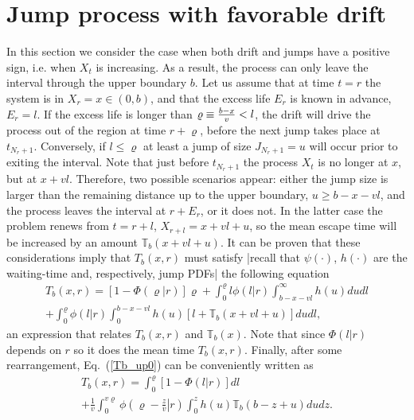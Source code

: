 \documentclass[english,aps,a4paper,twocolumn,showpacs,showkeys,amsfonts,amsmath,amssymb,amscd,nofootinbib]{revtex4}
\newcommand{\1}{\'\i}
\newcommand{\TT}{\mathbb{T}}\newcommand{\FF}{\mathbb{F}}
\begin{document}
\section{\label{S_up}Jump process with favorable drift}%
In this section we consider the case when both drift and jumps
have a positive sign, i.e. when $X_t$ is increasing. As a result, the process can only leave the interval through the upper
boundary $b$. Let us assume that at time $t=r$ the system is in $X_r=x\in(0,b)$, and that the excess life $E_r$ is known in advance, $E_r=l$. If the excess life is longer than $\varrho \equiv {b-x\over v}< l$, the drift will drive the process
out of the region at time $r+\varrho$, before the next jump takes place at $t_{N_r+1}$. Conversely, if $l \leqslant \varrho$ at least a jump of size $J_{N_r+1}=u$ will occur prior to exiting the interval. Note that just before $t_{N_r+1}$ the process $X_t$ is no longer at $x$, but at $x+v l$. Therefore, two possible scenarios appear: either
the jump size is larger than the remaining distance up to the upper boundary, $u\geqslant b-x-v l$, and the process leaves the
interval at $r+E_r$, 
or it does not. In the latter case the problem renews from $t=r+l$, $X_{r+l}=x+v
l+u$, so the mean escape time will be increased by an amount $\TT_b\left(x+v
l+u\right)$. It can be proven that  these considerations imply
that $T_b(x,r)$ must satisfy |recall that $\psi(\cdot)$, $h(\cdot)$ are the
waiting-time and, respectively, jump PDFs| the following equation
\begin{eqnarray}
T_b(x,r)=\left[1-\Phi\left(\varrho|r\right)\right] \varrho +
\int^{\varrho}_{0} l
\phi(l|r) \int^{\infty}_{b-x-v l} h(u) d  ud  l\nonumber \\
+\int^{\varrho}_{0} \phi(l|r) \int^{b-x-v l}_{0} h(u)
\left[l+\TT_b\left(x+vl+u\right)\right]d  ud  l,
\label{Tb_up0}
\end{eqnarray} an expression that relates $T_b(x,r)$ and $\TT_b(x)$.
Note that since $\Phi\left(l|r\right)$   depends on   $r$ so it
does the mean time $T_b(x,r)$. Finally, after some rearrangement, Eq.~(\ref{Tb_up0}) can be conveniently written as
\begin{eqnarray}
T_b(x,r)= \int^{\varrho}_{0}\left[1-\Phi\left(l|r\right)\right]d
l \nonumber \\+ \frac{1}{v}\int^{v \varrho}_{0}
 \phi\left(\left.\varrho-\frac{z}{v}\right|r\right) \int^{z}_{0} h(u)
\TT_b\left(b-z+u\right)d  u  d  z. \label{Tb_up}%
\end{eqnarray}
\end{document}
